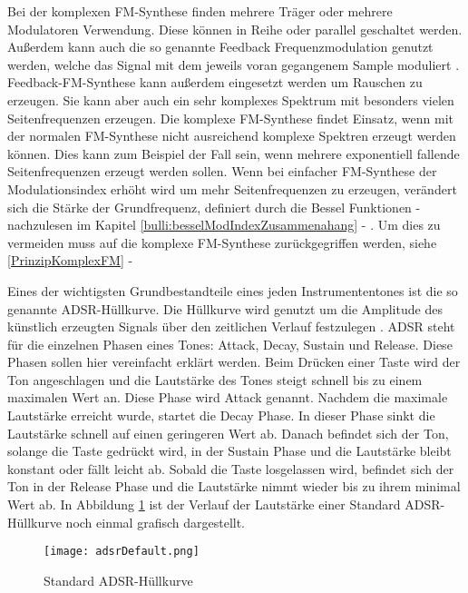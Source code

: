 Bei der komplexen FM-Synthese finden mehrere Träger oder mehrere Modulatoren Verwendung. Diese können in Reihe oder parallel geschaltet werden. Außerdem kann auch die so genannte Feedback Frequenzmodulation genutzt werden, welche das Signal mit dem jeweils voran gegangenem Sample moduliert \cite[S. 399 f.]{hornerPaper}. Feedback-FM-Synthese kann außerdem eingesetzt werden um Rauschen zu erzeugen. Sie kann aber auch ein sehr komplexes Spektrum mit besonders vielen Seitenfrequenzen erzeugen. Die komplexe FM-Synthese findet Einsatz, wenn mit der normalen FM-Synthese nicht ausreichend komplexe Spektren erzeugt werden können. Dies kann zum Beispiel der Fall sein, wenn mehrere exponentiell fallende Seitenfrequenzen erzeugt werden sollen. Wenn bei einfacher FM-Synthese der Modulationsindex erhöht wird um mehr Seitenfrequenzen zu erzeugen, verändert sich die Stärke der Grundfrequenz, definiert durch die Bessel Funktionen - nachzulesen im Kapitel \ref{bulli:besselModIndexZusammenahang} - . Um dies zu vermeiden muss auf die komplexe FM-Synthese zurückgegriffen werden, siehe \ref{PrinzipKomplexFM} - 

Eines der wichtigsten Grundbestandteile eines jeden Instrumententones ist die so genannte ADSR-Hüllkurve. Die Hüllkurve wird genutzt um die Amplitude des künstlich erzeugten Signals über den zeitlichen Verlauf festzulegen \cite[S. 532f]{chowningPaper}. ADSR steht für die einzelnen Phasen eines Tones: Attack, Decay, Sustain und Release. Diese Phasen sollen hier vereinfacht erklärt werden. Beim Drücken einer Taste wird der Ton angeschlagen und die Lautstärke des Tones steigt schnell bis zu einem maximalen Wert an. Diese Phase wird Attack genannt. Nachdem die maximale Lautstärke erreicht wurde, startet die Decay Phase. In dieser Phase sinkt die Lautstärke schnell auf einen geringeren Wert ab. Danach befindet sich der Ton, solange die Taste gedrückt wird, in der Sustain Phase und die Lautstärke bleibt konstant oder fällt leicht ab. Sobald die Taste losgelassen wird, befindet sich der Ton in der Release Phase und die Lautstärke nimmt wieder bis zu ihrem minimal Wert ab. In Abbildung \ref{fig:adsrDefault} ist der Verlauf der Lautstärke einer Standard ADSR-Hüllkurve noch einmal grafisch dargestellt.

\begin{figure} [ht]
\centering
  \texttt{[image: adsrDefault.png]}
\caption{Standard ADSR-Hüllkurve}
\label{fig:adsrDefault}
\end{figure}

